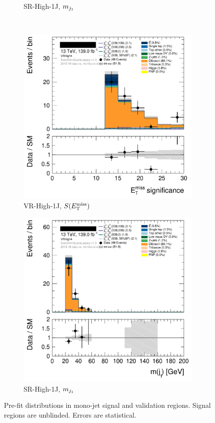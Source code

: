 \begin{figure}[tp]
\begin{subfigure}{0.48\textwidth}
\caption{SR-High-1J, $m_{j_1}$}
\end{subfigure}
\\[0.5em]
\begin{subfigure}{0.48\textwidth}
\centering
\includegraphics[width=\textwidth]{figures/2ljets_def_met_Sign_VRHigh4.png}
\caption{VR-High-1J, $S(E_\mathrm{T}^\mathrm{miss})$}
\end{subfigure}
\hfill
\begin{subfigure}{0.48\textwidth}
\centering
\includegraphics[width=\textwidth]{figures/2ljets_def_mjetone_VRHigh4.png}
\caption{SR-High-1J, $m_{j_1}$}
\end{subfigure}
\caption[
Pre-fit distributions in mono-jet signal and validation regions
]{%
Pre-fit distributions in mono-jet signal and validation regions.
Signal regions are unblinded.
Errors are statistical.
}
\label{fig:2ljets_high_1J_region}
\end{figure}

